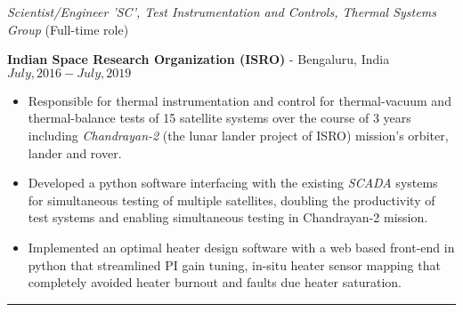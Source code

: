 \medskip

\noindent\textit{Scientist/Engineer 'SC', Test Instrumentation and Controls, Thermal Systems Group} (Full-time role)

\textbf{Indian Space Research Organization (ISRO)} - Bengaluru, India \hfill $July, 2016 - July, 2019$

\begin{itemize}
        \item Responsible for thermal instrumentation and control for thermal-vacuum and thermal-balance tests of 15 satellite systems over the course of 3 years including \textit{Chandrayan-2} (the lunar lander project of ISRO) mission's orbiter, lander and rover.
        \item Developed a python software interfacing with the existing \textit{SCADA} systems for simultaneous testing of multiple satellites, doubling the productivity of test systems and enabling simultaneous testing in Chandrayan-2 mission.
	\item Implemented an optimal heater design software with a web based front-end in python that streamlined PI gain tuning, in-situ heater sensor mapping that completely avoided heater burnout and faults due heater saturation.
\end{itemize}
\noindent\rule{\textwidth}{0.4pt}
